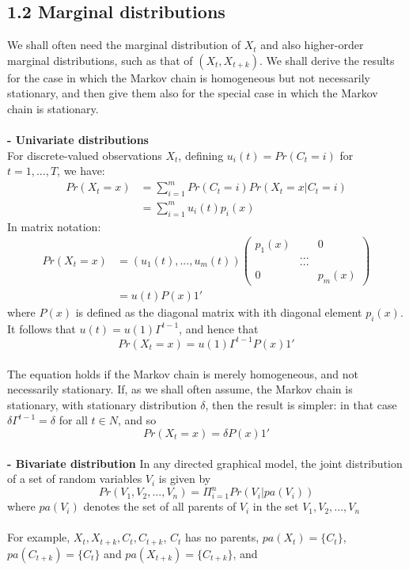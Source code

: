 \documentclass{article}
\begin{document}
\subsection*{1.2 Marginal distributions}
We shall often need the marginal distribution of $X_t$ and also higher-order marginal distributions, such as that of $(X_t, X_{t+k})$. We shall derive the results for the case in which the Markov chain is homogeneous but not necessarily stationary, and then give them also for the special case in which the Markov chain is stationary. \\
\\
\textbf{- Univariate distributions} \\
For discrete-valued observations $X_t$, defining $u_i(t) = Pr(C_t = i)$ for $t = 1, ..., T$, we have: 
\begin{align}
    Pr(X_t = x) & = \sum_{i=1}^m Pr(C_t = i) Pr(X_t = x | C_t = i) \\
    & = \sum_{i=1}^m u_i(t)p_i(x)
\end{align}
In matrix notation: 
\begin{align}
    Pr(X_t = x) & = (u_1(t), ..., u_m(t)) \begin{pmatrix} p_1(x) & & 0 \\ & ... & \\ & ... & \\ 0 & & p_m(x) \end{pmatrix}  \\
    & = u(t) P(x) 1'
\end{align}
where $P(x)$ is defined as the diagonal matrix with ith diagonal element $p_i(x)$. It follows that $u(t) = u(1) \Gamma^{t-1}$, and hence that 
$$Pr(X_t = x) = u(1) \Gamma^{t-1} P(x) 1'$$
\\
The equation holds if the Markov chain is merely homogeneous, and not necessarily stationary. If, as we shall often assume, the Markov chain is stationary, with stationary distribution $\delta$, then the result is simpler: in that case $\delta \Gamma^{t-1} = \delta$ for all $t \in N$, and so 
$$Pr(X_t = x) = \delta P(x) 1'$$
\\
\textbf{- Bivariate distribution}
In any directed graphical model, the joint distribution of a set of random variables $V_i$ is given by 
$$Pr(V_1, V_2, ..., V_n) = \Pi_{i=1}^n Pr(V_i | pa(V_i))$$
where $pa(V_i)$ denotes the set of all parents of $V_i$ in the set $V_1, V_2, ..., V_n$ \\
\\
For example, $X_t, X_{t+k}, C_t, C_{t+k}$, $C_t$ has no parents, $pa(X_t) = \{C_t\}$, $pa(C_{t+k}) = \{C_t\}$ and $pa(X_{t+k}) = \{C_{t+k}\}$, and
\end{document}
